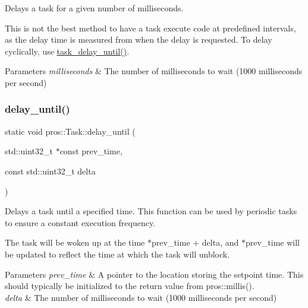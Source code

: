 Delays a task for a given number of milliseconds.

This is not the best method to have a task execute code at predefined intervals, as the delay time is measured from when the delay is requested. To delay cyclically, use \hyperlink{rtos_8h_a61c8ccf83a0dc79fc0e9fde5e87a0329}{task\+\_\+delay\+\_\+until()}.


\begin{DoxyParams}{Parameters}
{\em milliseconds} & The number of milliseconds to wait (1000 milliseconds per second) \\
\hline
\end{DoxyParams}
\mbox{\label{classpros_1_1Task_aa038d0eeb973ce7fca8689fa5bb91fec}} 
\subsubsection{\texorpdfstring{delay\+\_\+until()}{delay\_until()}}
{\footnotesize\ttfamily static void pros\+::\+Task\+::delay\+\_\+until (\begin{DoxyParamCaption}\item[{std\+::uint32\+\_\+t $\ast$const}]{prev\+\_\+time,  }\item[{const std\+::uint32\+\_\+t}]{delta }\end{DoxyParamCaption})\hspace{0.3cm}{\ttfamily [static]}}

Delays a task until a specified time. This function can be used by periodic tasks to ensure a constant execution frequency.

The task will be woken up at the time $\ast$prev\+\_\+time + delta, and $\ast$prev\+\_\+time will be updated to reflect the time at which the task will unblock.


\begin{DoxyParams}{Parameters}
{\em prev\+\_\+time} & A pointer to the location storing the setpoint time. This should typically be initialized to the return value from pros\+::millis(). \\
\hline
{\em delta} & The number of milliseconds to wait (1000 milliseconds per second) \\
\hline
\end{DoxyParams}
\mbox{\label{classpros_1_1Task_a9b1eda960abda807cb8447075fc4ea44}} 
